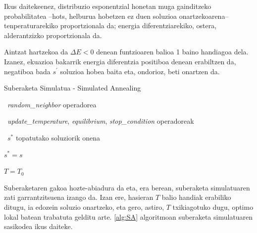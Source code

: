 \documentclass[eu]{ifirak}\usepackage[]{graphicx}\usepackage[]{color}
\begin{document}
Ikus daitekeenez, distribuzio esponentzial honetan muga gainditzeko probabilitatea --hots, helburua hobetzen ez duen soluzioa onartzekoarena-- tenperaturarekiko proportzionala da; energia diferentziarekiko, ostera, alderantzizko proportzionala da.

Aintzat hartzekoa da $\Delta E<0$ denean funtzioaren balioa 1 baino handiagoa dela. Izanez, ekuazioa bakarrik energia diferentzia positiboa denean erabiltzen da, negatiboa bada $s^\prime$ soluzioa hobea baita eta, ondorioz, beti onartzen da.

\begin{ifalgorithm}[t]
\begin{ifpseudo}{Suberaketa Simulatua - Simulated Annealing}
\item \In\ \textit{random\_neighbor} operadorea
\item \In\ \textit{update\_temperature}, \textit{equilibrium}, \textit{stop\_condition} operadoreak
\item \Out\ $s^*$ topatutako soluziorik onena
\item $s^*=s$
\item $T=T_0$
\item {}
\item {}
\item {}
\item {}
\item {}
\item {}
\item {}
\item \TT{\EIf}
\item \TT{\Else}
\item {}
\item \T{\Done}
\item {}
\item \Done
\end{ifpseudo}
\caption{Suberaketa Simulatuaren sasikodea}\label{alg:SA}
\end{ifalgorithm}

Suberaketaren gakoa hozte-abiadura da eta, era berean, suberaketa simulatuaren zati garrantzitsuena izango da. Izan ere, hasieran $T$ balio handiak erabiliko ditugu, ia edozein soluzio onartzeko, eta gero, astiro, $T$ txikiagotuko dugu, optimo lokal batean trabatuta gelditu arte. \ref{alg:SA} algoritmoan suberaketa simulatuaren sasikodea ikus daiteke.
\end{document}

